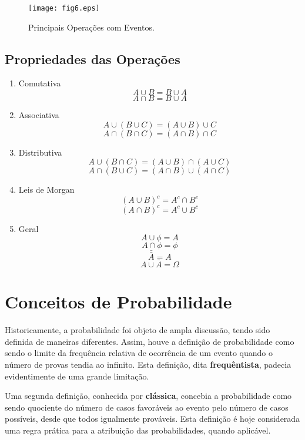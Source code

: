 \documentclass[a4paper,12pt]{report}
\begin{document}
{\begin{figure}[!htb]
\centering
  \texttt{[image: fig6.eps]}\\
  \vspace{-1cm}
  \caption{Principais Operações com Eventos.}\label{}
\end{figure}

\newpage

\subsection{Propriedades das Operações}

\begin{enumerate}
    \item Comutativa
$$A \cup B = B \cup A$$
$$A \cap B = B \cup A$$
    \item Associativa
$$A \cup (B \cup C) = (A \cup B)\cup C$$
$$A \cap (B \cap C) = (A \cap B)\cap C$$
    \item Distributiva
$$A \cup (B \cap C) = (A \cup B)\cap (A \cup C)$$
$$A \cap (B \cup C) = (A \cap B)\cup (A \cap C)$$
    \item Leis de Morgan
$$ (A \cup B)^{c}= A^{c} \cap B^{c}$$
$$ (A \cap B)^{c}= A^{c} \cup B^{c}$$
\item Geral
$$ A \cup \phi = A$$
$$ A \cap \phi = \phi$$
$$ \bar{\bar{A}}=A $$
$$ A \cup \bar{A}= \Omega $$
\end{enumerate}





\section{Conceitos de Probabilidade}

Historicamente, a probabilidade foi objeto de ampla discussão,
tendo sido definida de maneiras diferentes. Assim, houve a
definição de probabilidade como sendo o limite da frequência
relativa de ocorrência de um evento quando o número de provas
tendia ao infinito. Esta definição, dita \textbf{frequêntista},
padecia evidentimente de uma grande limitação.\vskip0.3cm



Uma segunda definição, conhecida por \textbf{clássica}, concebia a
probabilidade como sendo quociente do número de casos favoráveis
ao evento pelo número de casos possíveis, desde que todos
igualmente prováveis. Esta definição é hoje considerada uma regra
prática para a atribuição das probabilidades, quando
aplicável.\vskip0.3cm

}
\end{document}
